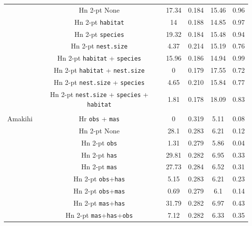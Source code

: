 \documentclass[authoryear,preprint,review,12pt]{elsarticle}
\begin{document}
\begin{table}
\begin{tabular}{c c c c c c}
 & Hn 2-pt  None                                                     &  17.34 &  0.184  &  15.46  &  0.96 \\
 & Hn 2-pt \texttt{habitat}                                          &  14     &  0.188  &  14.85  &  0.97 \\
 & Hn 2-pt \texttt{species}                                          &  19.32  &  0.184  &  15.48  &  0.94 \\
 & Hn 2-pt \texttt{nest.size}                                        &  4.37   &  0.214  &  15.19  &  0.76 \\
 & Hn 2-pt \texttt{habitat} + \texttt{species}                       &  15.96  &  0.186  &  14.94  &  0.99 \\
 & Hn 2-pt \texttt{habitat} + \texttt{nest.size}                     &  0      &  0.179  &  17.55  &  0.72 \\
 & Hn 2-pt \texttt{nest.size} + \texttt{species}                     &  4.65   &  0.210  &  15.84  &  0.77 \\
 & Hn 2-pt \texttt{nest.size} + \texttt{species} + \texttt{habitat}  &  1.81   &  0.178  &  18.09  &  0.83 \\
 &&&&&\\
Amakihi  & Hr \texttt{obs} + \texttt{mas} & 0 &  0.319 & 5.11 & 0.08\\ %
 & Hn 2-pt None                                    &  28.1   &  0.283  &  6.21  &  0.12 \\
 & Hn 2-pt \texttt{obs}                            &  1.31   &  0.279  &  5.86  &  0.04 \\
 & Hn 2-pt \texttt{has}                            &  29.81  &  0.282  &  6.95  &  0.33 \\
 & Hn 2-pt \texttt{mas}                            &  27.73  &  0.284  &  6.52  &  0.31 \\
 & Hn 2-pt \texttt{obs}+\texttt{has}               &  5.15   &  0.283  &  6.21  &  0.23 \\
 & Hn 2-pt \texttt{obs}+\texttt{mas}               &  0.69   &  0.279  &  6.1  &  0.14 \\
 & Hn 2-pt \texttt{mas}+\texttt{has}               &  31.79  &  0.282  &  6.97  &  0.43 \\
 & Hn 2-pt \texttt{mas}+\texttt{has}+\texttt{obs}  &  7.12  &  0.282  &  6.33  &  0.35 \\
\hline
\end{tabular}
\label{williams-pike-table}
\end{table}
\end{document}
